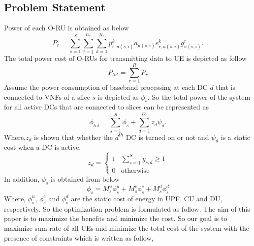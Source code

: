 \documentclass[conference]{IEEEtran}
\begin{document}
\subsection{Problem Statement}
Power of each O-RU is obtained as below
\begin{equation}
P_r =  \sum_{s=1}^{S} \sum_{i=1}^{U_v} \sum_{k=1}^{K_s}p_{r,u(s,i)}^{k}a_{u(s,i)} e^{k}_{r,u(s,i)}g_{u(s,i)}^r.
\end{equation}
The total power cost of O-RUs for transmitting data to UE is depicted as follow
\begin{equation}
P_{tot} = \sum_{r=1}^{R}P_r
\end{equation}
Assume the power consumption of baseband processing at each DC $d$ that is connected to VNFs of a slice $s$ is depicted as
$\phi_{s}$. So the total power of the system for all active DCs that are connected to slices can be represented as
\begin{equation*}
\textstyle \phi_{tot} = \sum_{s=1}^{S}\phi_{s} + \sum_{d=1}^{D_c}z_d \psi_d .
\end{equation*}
Where,$z_d$ is shown that whether the $d^{th}$ DC is turned on or not and $\psi_d$ is a static cost when a DC is active.
\begin{equation}
  z_d =
    \begin{cases}
      1 & \sum_{s=1}^{S}y_{s,d} \geq 1 \\
      0 & \text{otherwise}
    \end{cases}       
\end{equation}  
In addition, $\phi_{s}$ is obtained from below
\begin{equation}
\phi_{s} = M_s^u \phi_s^u + M_s^c \phi_s^c+ M_s^d \phi_s^d
\end{equation}
Where, $\phi_s^u$, $\phi_s^c$ and $\phi_s^d$ are the static cost of energy in UPF, CU and DU, respectively. 
So the optimization problem is formulated as follow.
The aim of this paper is to maximize the benefits and minimize the cost. So our goal is to maximize sum rate of all UEs and minimize the total cost of the system with the presence of constraints which is written as follow,
\end{document}

